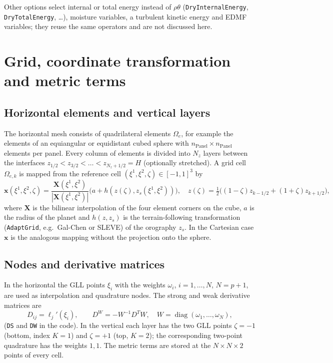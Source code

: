 \documentclass[11pt,a4paper]{article}
\newcommand{\code}[1]{\texttt{#1}}
\begin{document}
Other options select internal or total energy instead of
$\rho\theta$ (\code{DryInternalEnergy}, \code{DryTotalEnergy}, \dots), moisture
variables, a turbulent kinetic energy and EDMF variables; they reuse the same
operators and are not discussed here.

\section{Grid, coordinate transformation and metric terms}

\subsection{Horizontal elements and vertical layers}

The horizontal mesh consists of quadrilateral elements $\Omega_e$, for
example the elements of an equiangular or equidistant cubed sphere with
$n_{\text{Panel}}\times n_{\text{Panel}}$ elements per panel. Every column of
elements is divided into $N_z$ layers between the interfaces
$z_{1/2} < z_{3/2} < \dots < z_{N_z+1/2} = H$ (optionally stretched). A
grid cell $\Omega_{e,k}$ is mapped from the reference cell
$(\xi^1,\xi^2,\zeta)\in[-1,1]^3$ by
\begin{equation}
  \bm{x}(\xi^1,\xi^2,\zeta) = \frac{\bm{X}(\xi^1,\xi^2)}{|\bm{X}(\xi^1,\xi^2)|}
    \bigl(a + h(z(\zeta), z_s(\xi^1,\xi^2))\bigr),
  \quad
  z(\zeta) = \tfrac12\bigl((1-\zeta) z_{k-1/2} + (1+\zeta) z_{k+1/2}\bigr),
\end{equation}
where $\bm X$ is the bilinear interpolation of the four element corners on the
cube, $a$ is the radius of the planet and $h(z,z_s)$ is the terrain-following
transformation (\code{AdaptGrid}, e.g.\ Gal-Chen or SLEVE) of the
orography $z_s$. In the Cartesian case $\bm x$ is the analogous mapping
without the projection onto the sphere.

\subsection{Nodes and derivative matrices}

In the horizontal the GLL points $\xi_i$ with the weights $\omega_i$,
$i=1,\dots,N$, $N=p+1$, are used as interpolation and quadrature nodes. The
strong and weak derivative matrices are
\begin{equation}
  D_{ij} = \ell_j'(\xi_i), \qquad
  D^W = -W^{-1} D^T W, \quad W = \operatorname{diag}(\omega_1,\dots,\omega_N),
\end{equation}
(\code{DS} and \code{DW} in the code). In the vertical each layer has the
two GLL points $\zeta = -1$ (bottom, index $K=1$) and $\zeta=+1$ (top,
$K=2$); the corresponding two-point quadrature has the weights $1,1$.
The metric terms are stored at the $N\times N\times 2$ points of every cell.
\end{document}
